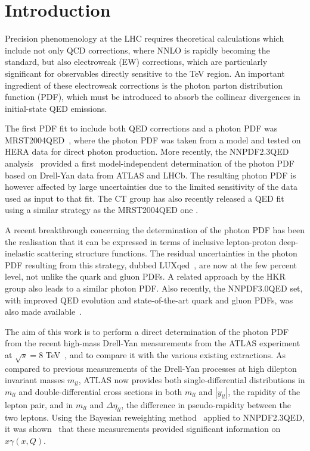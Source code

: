 \section{Introduction}

Precision phenomenology at the LHC requires theoretical calculations
which include not only QCD corrections, where NNLO is rapidly becoming
the standard, but also electroweak (EW) corrections, which are
particularly significant for observables directly sensitive to the TeV
region.
%
An important ingredient of these electroweak corrections is the photon
parton distribution function (PDF), which must be introduced to absorb
the collinear divergences in initial-state QED emissions.

The first PDF fit to include both QED corrections and a photon PDF was
MRST2004QED~\cite{Martin:2004dh}, where the photon PDF was taken from
a model and tested on HERA data for direct photon production.
%
More recently, the NNPDF2.3QED analysis~\cite{Ball:2013hta} provided a
first model-independent determination of the photon PDF based on
Drell-Yan data from ATLAS and LHCb.
%
The resulting photon PDF is however affected by large uncertainties
due to the limited sensitivity of the data used as input to that fit.
%
The CT group has also recently released a QED fit using a similar
strategy as the MRST2004QED one \cite{Schmidt:2014aba}.

A recent breakthrough concerning the determination of the photon PDF
has been the realisation that it can be expressed in terms of
inclusive lepton-proton deep-inelastic scattering structure functions.
%
The residual uncertainties in the photon PDF resulting from this
strategy, dubbed LUXqed~\cite{Manohar:2016nzj}, are now at the few
percent level, not unlike the quark and gluon PDFs.
%
A related approach by the HKR~\cite{Harland-Lang:2016apc}
group also leads to a similar photon PDF.
%
Also recently, the NNPDF3.0QED set, with improved
QED evolution and state-of-the-art quark and gluon
PDFs, was also made available~\cite{Bertone:2016ume,Ball:2014uwa}.

The aim of this work is to perform a direct determination of the
photon PDF from the recent high-mass Drell-Yan measurements from the
ATLAS experiment at $\sqrt{s}=8$ TeV~\cite{Aad:2016zzw}, and to
compare it with the various existing extractions.
%
As compared to previous measurements of the Drell-Yan processes at
high dilepton invariant masses $m_{ll}$, ATLAS now provides both
single-differential distributions in $m_{ll}$ and double-differential
cross sections in both $m_{ll}$ and $|y_{ll}|$, the rapidity of the
lepton pair, and in $m_{ll}$ and $\Delta\eta_{ll}$, the difference in
pseudo-rapidity between the two leptons.
%
Using the Bayesian reweighting method~\cite{Ball:2011gg,Ball:2010gb}
applied to NNPDF2.3QED, it was shown~\cite{Aad:2016zzw} that these
measurements provided significant information on $x\gamma(x,Q)$.

